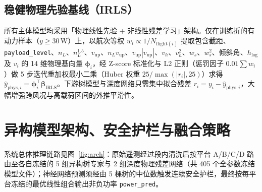 \documentclass[UTF8,a4paper,11pt,fontset=windows]{ctexart}
\newcommand{\W}{\,\mathrm{W}}
\newcommand{\code}[1]{\texttt{#1}}
\begin{document}
\subsection{稳健物理先验基线（IRLS）}

所有主体模型均采用「物理线性先验 + 非线性残差学习」架构。仅在训练折的有动力样本（$y \ge 30\W$）上，以航次等权 $w_i \propto 1/N_{\mathrm{flight}(i)}$ 提取包含截距、\code{payload\_level}、$n_L$、$n_L^{1.5}$、$v_{\mathrm{up}}$、$n_L v_{\mathrm{up}}$、$v_{\mathrm{up}}|v_{\mathrm{up}}|$、$v_h$、$v_h^2$、$w_s$、$w_s^2$、倾斜角、$h_{\log}$ 及 $v_i$ 的 14 维物理基向量 $\boldsymbol{\phi}_i$，经 Z-score 标准化与 L2 正则（惩罚因子 $0.01\sum w_i$）做 5 步迭代重加权最小二乘（Huber 权重 $25/\max(|r_i|,25)$）求得 $\hat y_{\mathrm{phys},i} = \boldsymbol{\phi}_i^{\top}\boldsymbol{\beta}_{\mathrm{IRLS}}$。下游树模型与深度网络只需集中拟合残差 $r_i = y_i - \hat y_{\mathrm{phys},i}$，大幅增强跨风况与高载荷区间的外推平滑性。

\section{异构模型架构、安全护栏与融合策略}

系统总体推理链路见图~\ref{fig:arch}：原始遥测经过段内清洗后按平台 A/B/C/D 路由至各自冻结的 5 组异构树专家与 2 组深度物理残差网络（共 405 个全参数冻结模型文件）；神经网络预测须经由 5 棵树的中位数触发连续安全护栏，最终按每平台冻结的最优线性组合输出非负功率 \code{power\_pred}。
\end{document}
